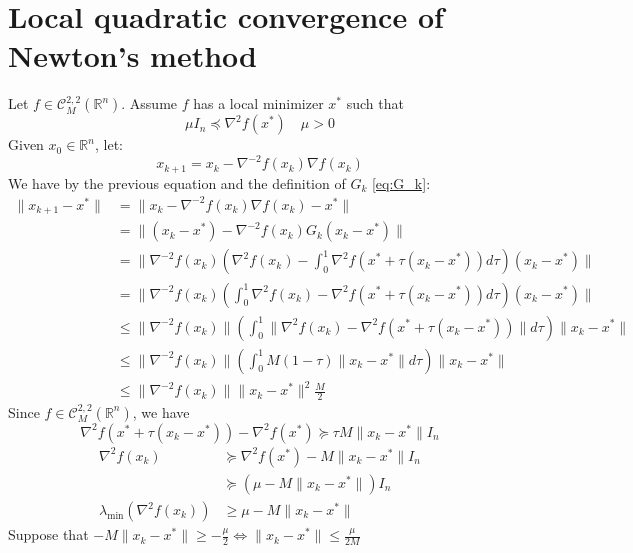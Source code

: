\documentclass[12pt, openany]{report}
\newcommand{\R}{\mathbb{R}}
\newcommand{\C}{\mathcal{C}}
\theoremstyle{definition}
\begin{document}
\section{Local quadratic convergence of Newton's method}
Let $f \in \C_M^{2,2}(\R^n)$. Assume $f$ has a local minimizer $x^*$ such that
\begin{equation}\label{eq:hessian_bound2}
	\mu I_n \preceq \nabla^2 f(x^*) \quad \mu > 0
\end{equation}
Given $x_0 \in \R^n$, let:
\begin{equation}\label{eq:newton}
	x_{k+1} = x_k - \nabla^{-2} f(x_k) \nabla f(x_k)
\end{equation}
We have by the previous equation and the definition of $G_k$ \eqref{eq:G_k}:
\begin{equation}\label{eq:bound_x_k+1}
	\begin{aligned}
		\|x_{k+1}-x^*\| &= \|x_k - \nabla^{-2} f(x_k) \nabla f(x_k) - x^*\|\\
		&= \|(x_k-x^*)-\nabla^{-2} f(x_k)G_k(x_k-x^*)\|\\
		&= \|\nabla^{-2} f(x_k) \left(\nabla^2f(x_k)-\int_{0}^{1}\nabla^2f(x^*+\tau(x_k-x^*))d\tau\right)(x_k-x^*)\|\\
		&= \|\nabla^{-2} f(x_k) \left( \int_{0}^{1} \nabla^2f(x_k)-\nabla^2f(x^*+\tau(x_k-x^*))d\tau\right)(x_k-x^*)\|\\
		&\leq \|\nabla^{-2} f(x_k)\| \left( \int_{0}^{1} \|\nabla^2f(x_k)-\nabla^2f(x^*+\tau(x_k-x^*))\|d\tau\right)\|x_k-x^*\|\\
		&\leq \|\nabla^{-2} f(x_k)\| \left( \int_{0}^{1} M(1-\tau) \|x_k-x^*\|d\tau\right)\|x_k-x^*\|\\
		&\leq \|\nabla^{-2} f(x_k)\|\|x_k-x^*\|^2\frac{M}{2}
	\end{aligned}
\end{equation}
Since $f\in \C^{2,2}_M(\R^n)$, we have
\begin{equation}
	\nabla^2 f(x^*+\tau(x_k-x^*)) - \nabla^2 f(x^*) \succeq \tau M \|x_k-x^*\|I_n
\end{equation}
\begin{equation}
	\begin{aligned}
		\nabla^2 f(x_k) &\succeq \nabla^2 f(x^*) - M \|x_k-x^*\|I_n\\
		&\succeq (\mu - M \|x_k-x^*\|)I_n\\
		\lambda_{\min}(\nabla^2 f(x_k)) &\geq \mu - M \|x_k-x^*\|
	\end{aligned}
\end{equation}
Suppose that $-M \|x_k-x^*\| \geq - \frac{\mu}{2} \Leftrightarrow \|x_k-x^*\| \leq \frac{\mu}{2M}$\\
\end{document}
